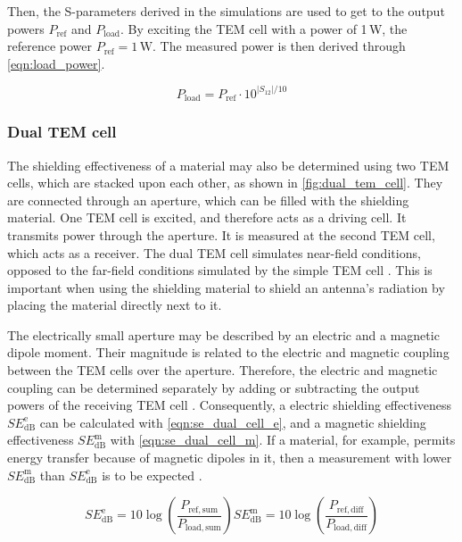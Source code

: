 Then, the S-parameters derived in the simulations are used to get to the output powers $P_\mathrm{ref}$ and $P_\mathrm{load}$. By exciting the TEM cell with a power of 1\,W, the reference power $P_\mathrm{ref}=1\,\mathrm{W}$. The measured power is then derived through \autoref{eqn:load_power}.

\begin{equation}
    P_\mathrm{load}=P_\mathrm{ref}\cdot10^{|S_\mathrm{12}|/10}
    \label{eqn:load_power}
\end{equation}



\subsubsection{Dual TEM cell}

The shielding effectiveness of a material may also be determined using two TEM cells, which are stacked upon each other, as shown in \autoref{fig:dual_tem_cell}. They are connected through an aperture, which can be filled with the shielding material. One TEM cell is excited, and therefore acts as a driving cell. It transmits power through the aperture. It is measured at the second TEM cell, which acts as a receiver. The dual TEM cell simulates near-field conditions, opposed to the far-field conditions simulated by the simple TEM cell \cite{MORARI_BĂLAN_2015}. This is important when using the shielding material to shield an antenna's radiation by placing the material directly next to it.

The electrically small aperture may be described by an electric and a magnetic dipole moment. Their magnitude is related to the electric and magnetic coupling between the TEM cells over the aperture. Therefore, the electric and magnetic coupling can be determined separately by adding or subtracting the output powers of the receiving TEM cell \cite{MORARI_BĂLAN_2015, 4091811}. Consequently, a electric shielding effectiveness $SE_\mathrm{dB}^\mathrm{e}$ can be calculated with \autoref{eqn:se_dual_cell_e}, and a magnetic shielding effectiveness $SE_\mathrm{dB}^\mathrm{m}$ with \autoref{eqn:se_dual_cell_m}. If a material, for example, permits energy transfer because of magnetic dipoles in it, then a measurement with lower $SE_\mathrm{dB}^\mathrm{m}$ than $SE_\mathrm{dB}^\mathrm{e}$ is to be expected \cite{4091811}.


\begin{subequations}
    \begin{equation}
        SE_\mathrm{dB}^\mathrm{e}=10\log{\left( \frac{P_\mathrm{ref, sum}}{P_\mathrm{load,sum}} \right)}
        \label{eqn:se_dual_cell_e}
    \end{equation}
    \begin{equation}
        SE_\mathrm{dB}^\mathrm{m}=10\log{\left( \frac{P_\mathrm{ref, diff}}{P_\mathrm{load,diff}} \right)}
        \label{eqn:se_dual_cell_m}
    \end{equation}
\end{subequations}

